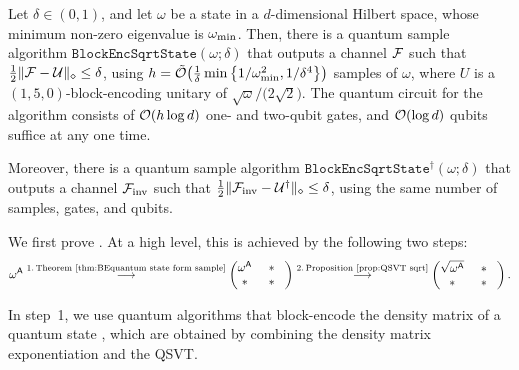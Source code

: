 \begin{proposition}
\label{prop:block enc sqrt state}
Let $\delta \in (0, 1)$, and let $\omega$ be a state in a $d$-dimensional Hilbert space, whose minimum non-zero eigenvalue is $\omega_{\rm min}$. 
Then, there is a quantum sample algorithm $\mathtt{BlockEncSqrtState}(\omega; \delta)$ that outputs a channel ${\mathcal{F}}$ such that $\frac{1}{2}\|{\mathcal{F}} - {\mathcal{U}}\|_\diamond \leq \delta$, using $h = \tilde{{\mathcal{O}}}\big(\frac{1}{\delta}\min\big\{1/\omega_{\rm min}^2, 1/\delta^4\big\}\big)$ samples of $\omega$,
where $U$ is a $(1, 5, 0)$-block-encoding unitary of $\sqrt{\omega}/\big(2\sqrt{2}\big)$.
The quantum circuit for the algorithm consists of ${\mathcal{O}}(h\log{d})$ one- and two-qubit gates, and ${\mathcal{O}}(\log{d})$ qubits suffice at any one time.

Moreover, there is a quantum sample algorithm $\mathtt{BlockEncSqrtState}^\dag(\omega; \delta)$ that outputs a channel ${\mathcal{F}}_{\rm inv}$ such that $\frac{1}{2}\|{\mathcal{F}}_{\rm inv} - {\mathcal{U}}^\dag\|_\diamond \leq \delta$, using the same number of samples, gates, and qubits.
\end{proposition}




We first prove .    
At a high level, this is achieved by the following two steps:
\begin{align}
\label{eq:flow of trans purif}
\omega^{\mathsf{A}} \overset{1. \, \text{Theorem~\ref{thm:BEquantum state form sample}}}{\longrightarrow}
\begin{pmatrix}
    \omega^{\mathsf{A}} & \hspace*{1.5mm} * \hspace*{3mm} \\
    * & \hspace{1.5mm} * \hspace*{3mm}
\end{pmatrix}
\overset{2. \, \text{Proposition~\ref{prop:QSVT sqrt}}}{\longrightarrow}
\begin{pmatrix}
    \sqrt{\omega^{\mathsf{A}}} & \hspace*{1.5mm} * \hspace*{3mm} \\
    * & \hspace{1.5mm} * \hspace*{3mm}
\end{pmatrix}.
\end{align}




In step~1, we use quantum algorithms that block-encode the density matrix of a quantum state \cite{gilyen2022improvedfidelity, wang2024fastQAtracedist, wang2023SampletoQuary, wang2024TimeEfficientEntEstSamp}, which are obtained by combining the density matrix exponentiation and the QSVT. 

